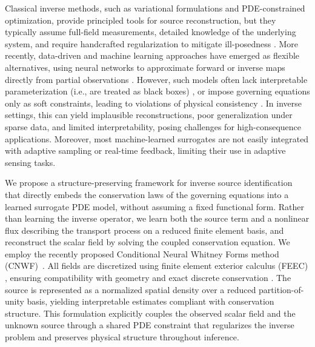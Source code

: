 \documentclass[onefignum,onetabnum]{siamart171218} %
\begin{document}
Classical inverse methods, such as variational formulations and PDE-constrained optimization, provide principled tools for source reconstruction, but they typically assume full-field measurements, detailed knowledge of the underlying system, and require handcrafted regularization to mitigate ill-posedness \cite{engl2015regularization}. More recently, data-driven and machine learning approaches have emerged as flexible alternatives, using neural networks to approximate forward or inverse maps directly from partial observations \cite{arridge2019solving}. However, such models often lack interpretable parameterization (i.e., are treated as black boxes) \cite{rowan2025definition, linardatos2020explainable}, or impose governing equations only as soft constraints, leading to violations of physical consistency \cite{trask2022enforcing}. In inverse settings, this can yield implausible reconstructions, poor generalization under sparse data, and limited interpretability, posing challenges for high-consequence applications. Moreover, most machine-learned surrogates are not easily integrated with adaptive sampling or real-time feedback, limiting their use in adaptive sensing tasks.


We propose a structure-preserving framework for inverse source identification that directly embeds the conservation laws of the governing equations into a learned surrogate PDE model, without assuming a fixed functional form. Rather than learning the inverse operator, we learn both the source term and a nonlinear flux describing the transport process on a reduced finite element basis, and reconstruct the scalar field by solving the coupled conservation equation. We employ the recently proposed Conditional Neural Whitney Forms method (CNWF)~\cite{kinch2025structure}. All fields are discretized using finite element exterior calculus (FEEC) \cite{arnold2006finite, arnold2018finite}, ensuring compatibility with geometry and exact discrete conservation \cite{actor2024data, trask2022enforcing}. The source is represented as a normalized spatial density over a reduced partition-of-unity basis, yielding interpretable estimates compliant with conservation structure. This formulation explicitly couples the observed scalar field and the unknown source through a shared PDE constraint that regularizes the inverse problem and preserves physical structure throughout inference.
\end{document}
